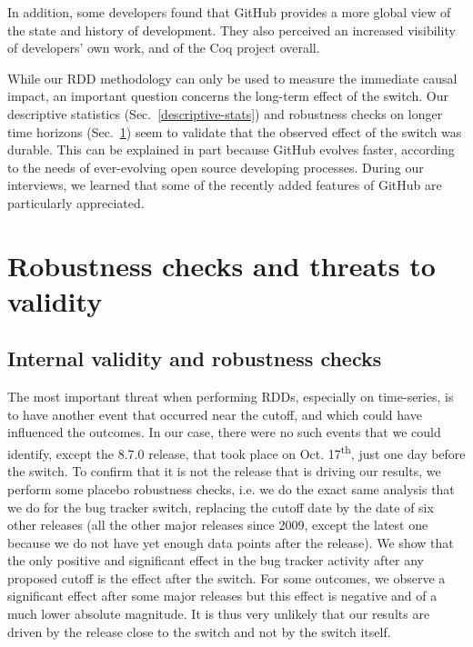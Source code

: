 \documentclass[conference]{IEEEtran}
\begin{document}
In addition, some developers found that GitHub provides a more global view of the state and history of development. They also perceived an increased visibility of developers' own work, and of the Coq project overall.  

While our RDD methodology can only be used to measure the immediate causal impact, an important question concerns the long-term effect of the switch. Our descriptive statistics (Sec.~\ref{descriptive-stats}) and robustness checks on longer time horizons (Sec.~\ref{threats}) seem to validate that the observed effect of the switch was durable. This can be explained in part because GitHub evolves faster, according to the needs of ever-evolving open source developing processes. During our interviews, we learned that some of the recently added features of GitHub are particularly appreciated.

\section{Robustness checks and threats to validity}
\label{threats}
\subsection{Internal validity and robustness checks}

The most important threat when performing RDDs, especially on time-series, is to have another event that occurred near the cutoff, and which could have influenced the outcomes. In our case, there were no such events that we could identify, except the 8.7.0 release, that took place on Oct. 17\textsuperscript{th}, just one day before the switch.
To confirm that it is not the release that is driving our results, we perform some placebo robustness checks, i.e. we do the exact same analysis that we do for the bug tracker switch, replacing the cutoff date by the date of six other releases (all the other major releases since 2009, except the latest one because we do not have yet enough data points after the release). We show that the only positive and significant effect in the bug tracker activity after any proposed cutoff is the effect after the switch. For some outcomes, we observe a significant effect after some major releases but this effect is negative and of a much lower absolute magnitude. It is thus very unlikely that our results are driven by the release close to the switch and not by the switch itself.  
\end{document}
